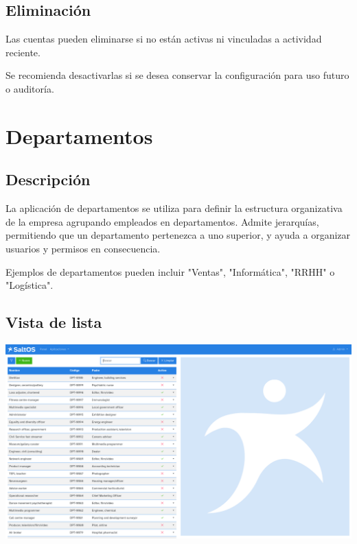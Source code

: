 \documentclass[a4paper]{article}
\begin{document}
\hypertarget{toc100}{}
\subsection{Eliminación}

Las cuentas pueden eliminarse si no están activas ni vinculadas a actividad reciente.

Se recomienda desactivarlas si se desea conservar la configuración para uso futuro o auditoría.


\hypertarget{toc101}{}
\section{Departamentos}

\hypertarget{toc102}{}
\subsection{Descripción}

La aplicación de departamentos se utiliza para definir la estructura organizativa de la empresa agrupando empleados en departamentos.
Admite jerarquías, permitiendo que un departamento pertenezca a uno superior, y ayuda a organizar usuarios y permisos en consecuencia.

Ejemplos de departamentos pueden incluir "Ventas", "Informática", "RRHH" o "Logística".

\hypertarget{toc103}{}
\subsection{Vista de lista}

\begin{center}\includegraphics[width=1\textwidth]{../ujest/snaps/test-screenshots-js-screenshots-hr-departments-list-es-es-1-snap.png}\end{center}
\end{document}
